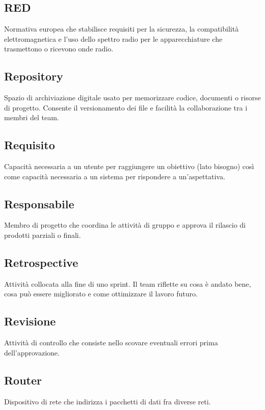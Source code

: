 \documentclass[a4paper,12pt]{article}
\begin{document}
\newpage
        \section{}
        
\newpage
      
        \section{}
        
          \subsection*{RED}
			Normativa europea che stabilisce requisiti per la sicurezza, la compatibilità elettromagnetica e l'uso dello spettro radio per le apparecchiature che trasmettono o ricevono onde radio.
          \subsection*{Repository}
			Spazio di archiviazione digitale usato per memorizzare codice, documenti o risorse di progetto. Consente il versionamento dei file e facilità la collaborazione tra i membri del team.
          \subsection*{Requisito}
			Capacità necessaria a un utente per raggiungere un obiettivo (lato bisogno) così come capacità necessaria a un sistema per rispondere a un'aspettativa.
          \subsection*{Responsabile}
			Membro di progetto che coordina le attività di gruppo e approva il rilascio di prodotti parziali o finali.
          \subsection*{Retrospective}
			Attività collocata alla fine di uno sprint. Il team riflette su cosa è andato bene, cosa può essere migliorato e come ottimizzare il lavoro futuro.
          \subsection*{Revisione}
			Attività di controllo che consiste nello scovare eventuali errori prima dell'approvazione.
          \subsection*{Router}
			Dispositivo di rete che indirizza i pacchetti di dati fra diverse reti.
\end{document}
